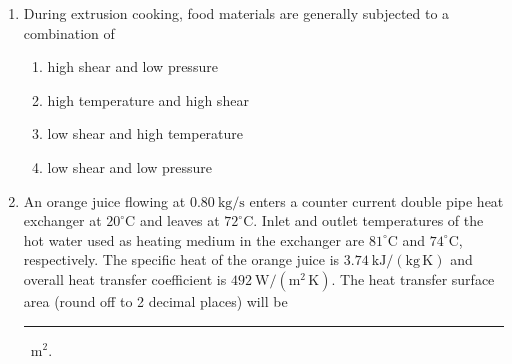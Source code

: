 \documentclass[journal,12pt,onecolumn]{IEEEtran}
\begin{document}
\begin{enumerate}[label=\arabic*.,resume]
\item During extrusion cooking, food materials are generally subjected to a combination of
\begin{multicols}{2}
\begin{enumerate}[label=(\Alph*)]
\item high shear and low pressure
\item high temperature and high shear
\item low shear and high temperature
\item low shear and low pressure
\end{enumerate}
\end{multicols}

\item An orange juice flowing at $0.80~\mathrm{kg/s}$ enters a counter current double pipe heat exchanger at $20^\circ$C and leaves at $72^\circ$C. Inlet and outlet temperatures of the hot water used as heating medium in the exchanger are $81^\circ$C and $74^\circ$C, respectively. The specific heat of the orange juice is $3.74~\mathrm{kJ/(kg\,K)}$ and overall heat transfer coefficient is $492~\mathrm{W/(m^2\,K)}$. The heat transfer surface area (round off to 2 decimal places) will be \rule{2.5cm}{0.1pt}~$\mathrm{m}^2$.

\end{enumerate}
\end{document}
